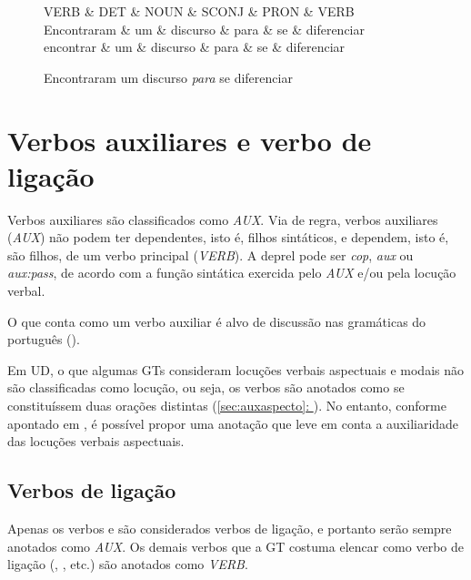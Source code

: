 \documentclass[output=paper,colorlinks,citecolor=brown]{langscibook}
\newcommand*{\fullref}[1]{\hyperref[{#1}]{\autoref*{#1}: \nameref*{#1}}} %
\begin{document}
		\begin{figure}[htbp]
					\centering
					\vspace{.8cm}
					\begin{dependency}
						\begin{deptext}
							VERB \& DET \& NOUN \& SCONJ \& PRON \& VERB \\
							Encontraram \& um \& discurso \& para \& se \& diferenciar \\
							encontrar \& um \& discurso \& para \& se \& diferenciar \\
						\end{deptext}
					\end{dependency}\label{dep:classesdinamicas}
					\caption{Encontraram um discurso \emph{para} se diferenciar}
				\end{figure}


\section{Verbos auxiliares e verbo de ligação}\label{sec:verbosauxiliares}

	Verbos auxiliares são classificados como \emph{AUX}. Via de regra, verbos auxiliares (\emph{AUX}) não podem ter dependentes, isto é, filhos sintáticos, e dependem, isto é, são filhos, de um verbo principal (\emph{VERB}). A deprel pode ser \emph{cop}, \emph{aux} ou \emph{aux:pass}, de acordo com a função sintática exercida pelo \emph{AUX} e/ou pela locução verbal.

	O que conta como um verbo auxiliar é alvo de discussão nas gramáticas do português (\citet{elvis2019locverbal}).

	Em UD, o que algumas GTs consideram locuções verbais aspectuais e modais não são classificadas como locução, ou seja, os verbos são anotados como se constituíssem duas orações distintas (\fullref{sec:auxaspecto}). No entanto, conforme apontado em \citet{elvis2019locverbal}, é possível propor uma anotação que leve em conta a auxiliaridade das locuções verbais aspectuais.

	\subsection{Verbos de ligação}\label{sec:verbosdeligacao}
	
		Apenas os verbos  e  são considerados verbos de ligação, e portanto serão sempre anotados como \textit{AUX}. Os demais verbos que a GT costuma elencar como verbo de ligação (, , etc.) são anotados como \textit{VERB}.
\end{document}
